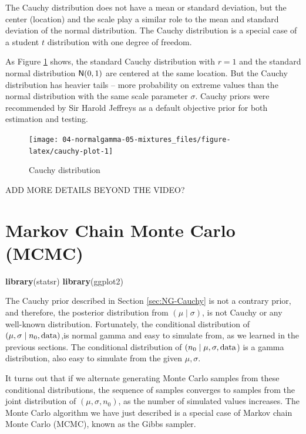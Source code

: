 \documentclass[]{book}
\newenvironment{Shaded}{\begin{snugshade}}{\end{snugshade}}
\newcommand{\KeywordTok}[1]{\textcolor[rgb]{0.13,0.29,0.53}{\textbf{{#1}}}}
\newcommand{\NormalTok}[1]{{#1}}
\theoremstyle{definition}
\theoremstyle{definition}
\theoremstyle{definition}
\theoremstyle{remark}
\begin{document}
The Cauchy distribution does not have a mean or standard deviation, but
the center (location) and the scale play a similar role to the mean and
standard deviation of the normal distribution. The Cauchy distribution
is a special case of a student \(t\) distribution with one degree of
freedom.

As Figure \ref{fig:cauchy-plot} shows, the standard Cauchy distribution
with \(r=1\) and the standard normal distribution \(\textsf{N}(0,1)\) are
centered at the same location. But the Cauchy distribution has heavier
tails -- more probability on extreme values than the normal distribution
with the same scale parameter \(\sigma\). Cauchy priors were recommended
by Sir Harold Jeffreys as a default objective prior for both estimation
and testing.

\begin{figure}

{\centering \texttt{[image: 04-normalgamma-05-mixtures\_files/figure-latex/cauchy-plot-1]} 

}

\caption{Cauchy distribution}\label{fig:cauchy-plot}
\end{figure}

ADD MORE DETAILS BEYOND THE VIDEO?

\section{Markov Chain Monte Carlo (MCMC)}\label{sec:NG-MCMC}

\begin{Shaded}
\begin{Highlighting}[]
\KeywordTok{library}\NormalTok{(statsr)}
\KeywordTok{library}\NormalTok{(ggplot2)}
\end{Highlighting}
\end{Shaded}

The Cauchy prior described in Section \ref{sec:NG-Cauchy} is not a
contrary prior, and therefore, the posterior distribution from
\((\mu \mid \sigma)\), is not Cauchy or any well-known distribution.
Fortunately, the conditional distribution of
\((\mu, \sigma \mid n_0, \text{data})\),is normal gamma and easy to simulate
from, as we learned in the previous sections. The conditional
distribution of \((n_0 \mid \mu, \sigma, \text{data}\)) is a gamma
distribution, also easy to simulate from the given \(\mu, \sigma\).

It turns out that if we alternate generating Monte Carlo samples from
these conditional distributions, the sequence of samples converges to
samples from the joint distribution of \((\mu, \sigma, n_0)\), as the
number of simulated values increases. The Monte Carlo algorithm we have
just described is a special case of Markov chain Monte Carlo (MCMC),
known as the Gibbs sampler.
\end{document}
